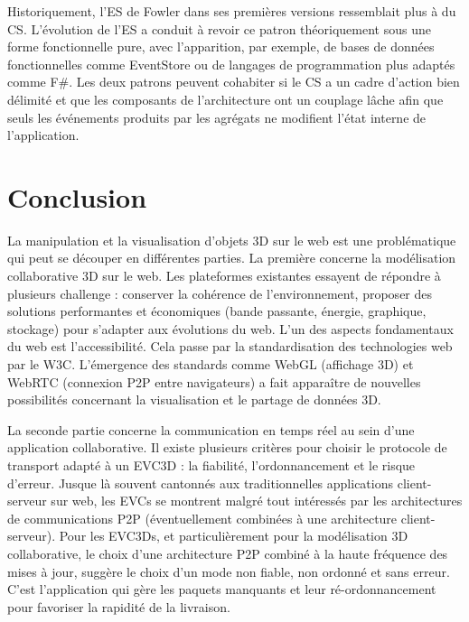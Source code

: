 Historiquement, l'\gls{ES} de Fowler dans ses premières versions ressemblait plus 
à du \gls{CS}. L'évolution de l'\gls{ES} a conduit à revoir ce patron théoriquement 
sous une forme fonctionnelle pure, avec l'apparition, par exemple, de bases de données fonctionnelles comme EventStore ou de langages de programmation plus adaptés comme F\#. Les deux 
patrons peuvent cohabiter si le \gls{CS} a un cadre d'action bien délimité 
et que les composants de l'architecture ont un couplage lâche afin que seuls les 
événements produits par les agrégats ne modifient l'état interne de l'application. 

\section{Conclusion}

La manipulation et la visualisation d'objets \gls{3D} sur le web est une 
problématique qui peut se découper en différentes parties.
La première concerne la modélisation collaborative \gls{3D} sur le web. Les 
plateformes existantes essayent de répondre à plusieurs challenge : conserver la cohérence 
de l'environnement, proposer des solutions performantes et économiques (bande 
passante, énergie, graphique, stockage)  pour s'adapter aux évolutions du web.
L'un des aspects fondamentaux du web est l'accessibilité. Cela passe par la 
standardisation des technologies web par le \gls{W3C}.  L'émergence des 
standards comme WebGL (affichage \gls{3D}) et WebRTC (connexion P2P entre 
navigateurs) a fait apparaître de nouvelles possibilités concernant la visualisation 
et le partage de données \gls{3D}. 


La seconde partie concerne la communication en temps réel au sein d'une 
application collaborative. Il existe plusieurs critères pour choisir le protocole de 
transport adapté à un \gls{EVC3D} : la fiabilité, l'ordonnancement et le risque 
d'erreur. 
Jusque là souvent cantonnés aux traditionnelles 
applications client-serveur sur web, les \glspl{EVC} se montrent malgré tout 
intéressés par les architectures de communications P2P (éventuellement 
combinées à une architecture client-serveur). Pour les \glspl{EVC3D}, et 
particulièrement pour la modélisation 3D collaborative, le choix d'une 
architecture \gls{P2P} combiné à la haute fréquence des mises à jour, suggère le 
choix d'un mode non fiable, non ordonné et sans erreur. C'est l'application qui gère 
les paquets manquants et leur ré-ordonnancement pour favoriser la rapidité 
de la livraison.

